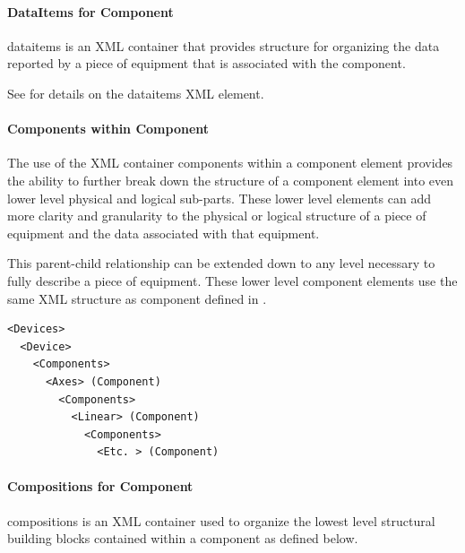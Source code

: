 \documentclass{mtconnect}	%
\providecommand{\DIFdelbegin}{} %
\providecommand{\DIFdelend}{} %
\begin{document}
\DIFdelbegin %


\DIFdelend \paragraph{DataItems for Component}\mbox{}

\gls{dataitems} is an XML container that provides structure for organizing the data reported by a piece of equipment that is associated with the \gls{component}.   

See  for details on the \gls{dataitems} XML element.

\paragraph{Components within Component}\mbox{}

The use of the XML container \gls{components} within a \gls{component} element provides the ability to further break down the structure of a \gls{component} element into even \gls{lower level} physical and logical sub-parts.  These \gls{lower level} elements can add more clarity and granularity to the physical or logical structure of a piece of equipment and the data associated with that equipment.

This parent-child relationship can be extended down to any level necessary to fully describe a piece of equipment. These \gls{lower level} \gls{component} elements use the same XML structure as \gls{component} defined in .

\begin{lstlisting}[firstnumber=1,escapechar=|,%
    caption={Example of parent Component and Child Elements },label={lst:example-of-parent-component-and-child-elements}]
<Devices>
  <Device>
    <Components>
      <Axes> (Component)
        <Components>
          <Linear> (Component)
            <Components>
              <Etc. > (Component)
\end{lstlisting}

\paragraph{Compositions for Component}\mbox{}

\gls{compositions} is an XML container used to organize the lowest level structural building blocks contained within a \gls{component} as defined below.
\end{document}
